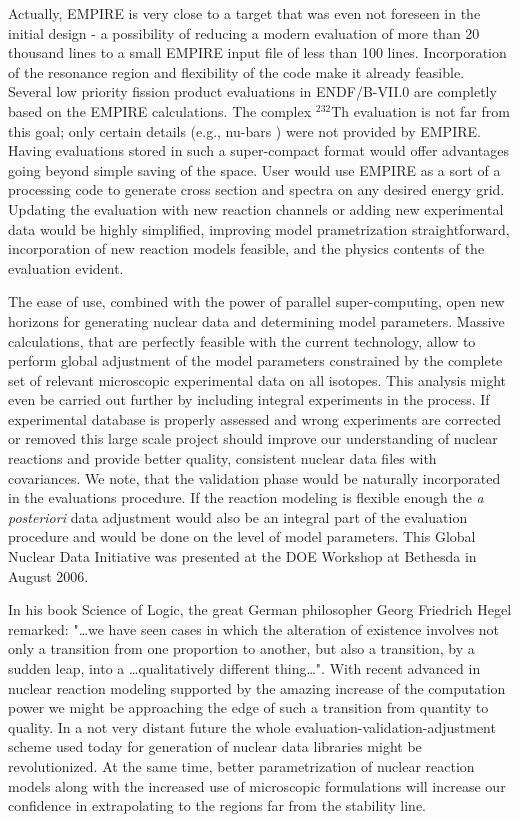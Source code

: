 \documentclass[twocolumn,amsmath,amssymb,10pt,groupedaddress,a4paper]{revtex4}
\begin{document}
Actually, EMPIRE is very close to a target that was even not foreseen in the initial design - a possibility of reducing a modern evaluation of more than 20 thousand lines to a small EMPIRE input file of less than 100 lines. Incorporation of the resonance region and flexibility of the code make it already feasible. Several low priority fission product evaluations in ENDF/B-VII.0 are completly based on the EMPIRE calculations. The complex $^{232}$Th evaluation is not far from this goal; only certain details (e.g., nu-bars ) were not provided by EMPIRE. Having evaluations stored in such a super-compact format would offer advantages going beyond simple saving of the space. User would use EMPIRE as a sort of a processing code to generate cross section and spectra on any desired energy grid.  Updating the evaluation with new reaction channels or adding new experimental data would be highly simplified, improving model prametrization straightforward, incorporation of new reaction models feasible, and the physics contents of the evaluation evident.

The ease of use, combined with the power of parallel super-computing, open new horizons for generating nuclear data and determining model parameters. Massive calculations, that are perfectly feasible with the current technology, allow to perform global adjustment of the model parameters constrained by the complete set of  relevant microscopic experimental data on all isotopes. This analysis might even be carried out further by including integral experiments in the process. If experimental database is properly assessed and wrong experiments are corrected or removed this large scale project should improve our understanding of nuclear reactions and  provide better quality, consistent nuclear data files with covariances. We note, that the validation phase would be naturally incorporated in the evaluations procedure. If the reaction modeling is flexible enough the \textit{a posteriori} data adjustment would also be an integral part of the evaluation procedure and would be done on the level of model parameters. This Global Nuclear Data Initiative was presented at the DOE Workshop at Bethesda in August 2006.

In his book Science of Logic, the great German philosopher Georg Friedrich Hegel remarked:
"\ldots we have seen cases in which the alteration of existence involves not only a transition from one proportion to another, but also a transition, by a sudden leap, into a \ldots qualitatively
different thing\ldots". With recent advanced in nuclear reaction modeling supported by the amazing increase of the computation power we might be approaching the edge of such a transition from quantity to quality. In a not very distant future the whole evaluation-validation-adjustment scheme used  today for generation of nuclear data libraries might be revolutionized. At the same time, better parametrization of nuclear reaction models along with the increased use of microscopic formulations will increase our confidence in extrapolating to the regions far from the stability line.
\end{document}
